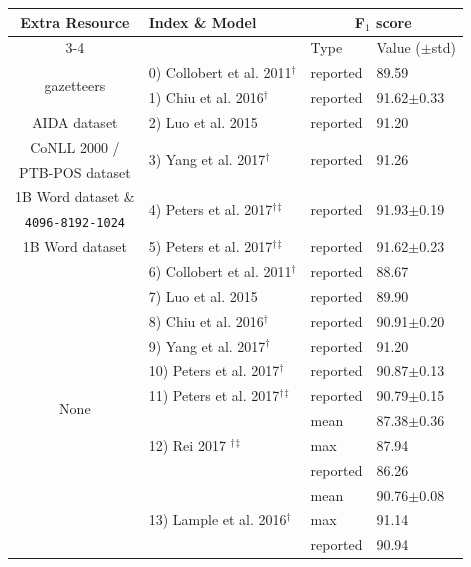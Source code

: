 \documentclass[letterpaper]{article} %
\begin{document}
\begin{table}[t!]
\center
\scalebox{0.7}
{
\begin{tabular}{c||l|l|l}
\hline
\multirow{2}{*}{Extra Resource} & \multirow{2}{*}{Index \& Model} & \multicolumn{2}{|c}{F$_1$ score}\\
\cline{3-4}
 & & Type & Value ($\pm$std)\\
\hline
\hline
\multirow{2}{*}{gazetteers} & 0) Collobert et al. 2011$^\dagger$ & reported& 89.59 \\
\cline{2-4}
& 1) Chiu et al. 2016$^\dagger$ & reported & 91.62$\pm$0.33 \\
\hline
AIDA dataset & 2) Luo et al. 2015 & reported& 91.20 \\
\hline
CoNLL 2000 / & \multirow{2}{*}{3) Yang et al. 2017$^\dagger$} & \multirow{2}{*}{reported} & \multirow{2}{*}{91.26} \\
PTB-POS dataset & & & \\
\hline
1B Word dataset \& & \multirow{2}{*}{4) Peters et al. 2017$^\dagger$$^\ddagger$ } & \multirow{2}{*}{reported} & \multirow{2}{*}{91.93$\pm$0.19} \\
\texttt{4096-8192-1024} & & & \\
\hline
1B Word dataset & 5) Peters et al. 2017$^\dagger$$^\ddagger$ & reported & 91.62$\pm$0.23 \\
\hline
\multirow{15}{*}{None} & 6) Collobert et al. 2011$^\dagger$ & reported& 88.67 \\
\cline{2-4}
& 7) Luo et al. 2015 & reported& 89.90 \\
\cline{2-4}
& 8) Chiu et al. 2016$^\dagger$ & reported & 90.91$\pm$0.20 \\
\cline{2-4}
& 9) Yang et al. 2017$^\dagger$ & reported & 91.20\\
\cline{2-4}
& 10) Peters et al. 2017$^\dagger$ & reported & 90.87$\pm$0.13\\
\cline{2-4}
& 11) Peters et al. 2017$^\dagger$$^\ddagger$ & reported & 90.79$\pm$0.15\\
\cline{2-4}
& \multirow{3}{*}{ 12) Rei 2017 $^\dagger$$^\ddagger$ } & mean & 87.38$\pm$0.36\\
\cline{3-4}
& & max & 87.94\\
\cline{3-4}
& & reported & 86.26\\
\cline{2-4}
& \multirow{3}{*}{13) Lample et al. 2016$^\dagger$} & mean & 90.76$\pm$0.08\\
\cline{3-4}
& & max & 91.14\\
\cline{3-4}
& & reported & 90.94\\

\end{tabular}}
\end{table}
\end{document}
